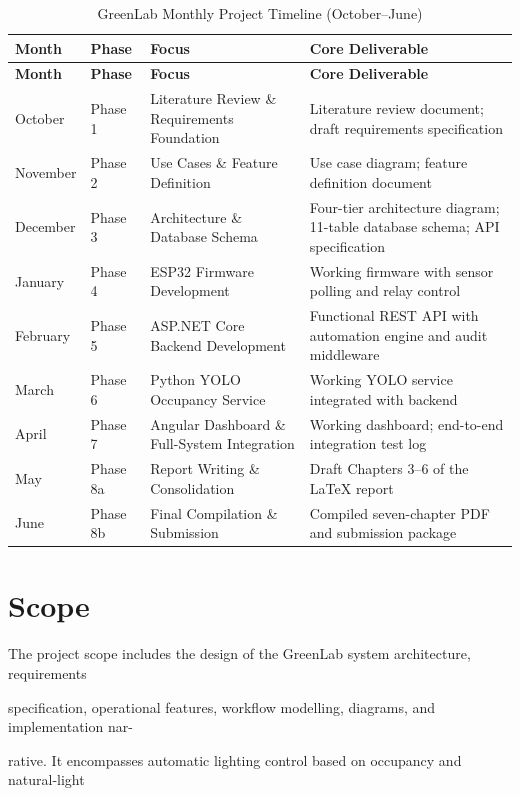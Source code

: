 \begin{longtable}{|L{1.8cm}|L{2.0cm}|L{5.0cm}|L{5.5cm}|}
\caption{GreenLab Monthly Project Timeline (October--June)} \label{tab:1-1} \\
\hline
{}
\textbf{Month} & \textbf{Phase} & \textbf{Focus} & \textbf{Core Deliverable} \\
\hline
\endfirsthead
\hline
{}
\textbf{Month} & \textbf{Phase} & \textbf{Focus} & \textbf{Core Deliverable} \\
\hline
\endhead
\hline
\endfoot
\hline
\endlastfoot
October & Phase 1 & Literature Review \& Requirements Foundation & Literature review document; draft requirements specification \\
\hline
November & Phase 2 & Use Cases \& Feature Definition & Use case diagram; feature definition document \\
\hline
December & Phase 3 & Architecture \& Database Schema & Four-tier architecture diagram; 11-table database schema; API specification \\
\hline
January & Phase 4 & ESP32 Firmware Development & Working firmware with sensor polling and relay control \\
\hline
February & Phase 5 & ASP.NET Core Backend Development & Functional REST API with automation engine and audit middleware \\
\hline
March & Phase 6 & Python YOLO Occupancy Service & Working YOLO service integrated with backend \\
\hline
April & Phase 7 & Angular Dashboard \& Full-System Integration & Working dashboard; end-to-end integration test log \\
\hline
May & Phase 8a & Report Writing \& Consolidation & Draft Chapters 3--6 of the LaTeX report \\
\hline
June & Phase 8b & Final Compilation \& Submission & Compiled seven-chapter PDF and submission package \\
\hline
\end{longtable}

\section{Scope}
The project scope includes the design of the GreenLab system architecture, requirements

speciﬁcation, operational features, workﬂow modelling, diagrams, and implementation nar-

rative. It encompasses automatic lighting control based on occupancy and natural-light

